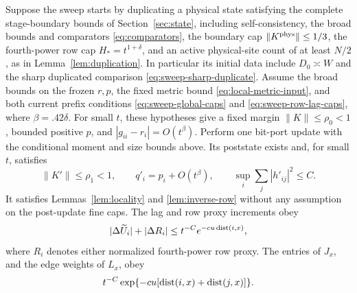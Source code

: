 \begin{lemma}\label{lem:local-prospective}
Suppose the sweep starts by duplicating a physical state satisfying the
complete stage-boundary bounds of Section~\ref{sec:state}, including
self-consistency, the broad bounds and comparators \eqref{eq:comparators},
the boundary cap \(\|K^{\rm phys}\|\le1/3\), the fourth-power row cap
\(H_*=t^{1+\delta}\), and an active physical-site count of at least
\(N/2\), as in Lemma~\ref{lem:duplication}.  In particular its initial
data include \(D_0\asymp W\) and the sharp duplicated comparison
\eqref{eq:sweep-sharp-duplicate}.  Assume the broad bounds on the frozen
\(r,p\), the fixed metric bound \eqref{eq:local-metric-input}, and both
current prefix conditions \eqref{eq:sweep-global-caps} and
\eqref{eq:sweep-row-lag-caps}, where \(\beta=.42\delta\).  For small
\(t\), these hypotheses give a fixed margin \(\|K\|\le\rho_0<1\),
bounded positive \(p\), and \(|g_{ii}-r_i|=O(t^\beta)\).
Perform one bit-port update with the
conditional moment and size bounds above.  Its poststate
exists and, for small \(t\), satisfies
\[
 \|K'\|\le\rho_1<1,\qquad
 q'_i=p_i+O(t^\beta),\qquad
 \sup_i\sum_j|h'_{ij}|^2\le C.
\]
It satisfies Lemmas~\ref{lem:locality} and \ref{lem:inverse-row}
without any assumption on the post-update fine caps.  The lag and row
proxy increments obey
\begin{equation}\label{eq:local-scalar-tails}
 |\Delta\widetilde U_i|+|\Delta R_i|
 \le t^{-C}e^{-cu\operatorname{dist}(i,x)},
\end{equation}
where \(R_i\) denotes either normalized fourth-power row proxy.
The entries of \(J_x\), and the edge weights of \(L_x\), obey
\begin{equation}\label{eq:local-matrix-tails}
 t^{-C}\exp\{-cu[\operatorname{dist}(i,x)+\operatorname{dist}(j,x)]\}.
\end{equation}
\end{lemma}

